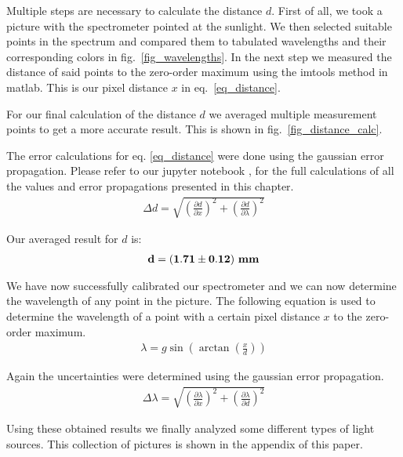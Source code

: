 Multiple steps are necessary to calculate the distance $d$.
First of all, we took a picture with the spectrometer pointed at the sunlight. We then selected suitable 
points in the spectrum and compared them to tabulated wavelengths and their corresponding colors 
in fig.~\ref{fig_wavelengths}. In the next step we measured the distance of said points to the zero-order maximum
using the imtools method in matlab. This is our pixel distance $x$ in eq.~\ref{eq_distance}.

For our final calculation of the distance $d$ we averaged multiple measurement points to get a more
accurate result. This is shown in fig.~\ref{fig_distance_calc}.

The error calculations for eq. \ref{eq_distance} were done using the gaussian error propagation.
Please refer to our jupyter notebook \cite{GitHub}, for the full calculations of all the values and 
error propagations presented in this chapter. 
\begin{align}
    \Delta d = \sqrt{\left(\frac{\partial d}{\partial x}\right)^2 + \left(\frac{\partial d}{\partial \lambda}\right)^2}
\end{align}

Our averaged result for $d$ is:
\begin{align}
    \bf d = (1.71 \pm 0.12) ~\si{\bf\milli\meter} \label{res_d}
\end{align}

We have now successfully calibrated our spectrometer and we can now determine the wavelength
of any point in the picture.
The following equation is used to determine the wavelength of a point with a certain pixel 
distance $x$ to the zero-order maximum.
\begin{align}
    \lambda = g \sin\left(\arctan\left(\frac{x}{d}\right)\right) \label{eq_lambda}
\end{align}

Again the uncertainties were determined using the gaussian error propagation.
\begin{align}
    \Delta \lambda = \sqrt{\left(\frac{\partial \lambda}{\partial x}\right)^2 + \left(\frac{\partial \lambda}{\partial d}\right)^2}
\end{align}

Using these obtained results we finally analyzed some different types of light
sources. This collection of pictures is shown in the appendix of this paper.